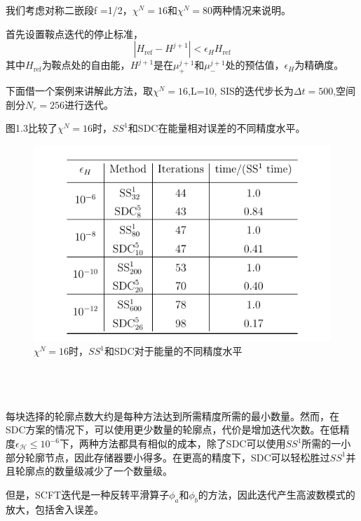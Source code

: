 我们考虑对称二嵌段f =1/2，$\chi^{N}=16$和$\chi^{N}=80$两种情况来说明。

首先设置鞍点迭代的停止标准，
\begin{equation}
\left|H_{\mathrm{ref}}-H^{j+1}\right|<\epsilon_{H} H_{\mathrm{ref}}
\end{equation}
其中$H_{\mathrm{ref}}$为鞍点处的自由能，$H^{j+1}$是在$\mu_{+}^{j+1}$和$\mu_{-}^{j+1}$处的预估值，$\epsilon_{H}$为精确度。

下面借一个案例来讲解此方法，取$\chi^N=16$,L=10,
SIS的迭代步长为$\Delta t=500$,空间剖分$N_r=256$进行迭代。

图1.3比较了$\chi^N=16$时，$SS^1$和SDC在能量相对误差的不同精度水平。
\begin{figure}[ht]
	\centering
	\includegraphics[scale=0.5]{7.png}
	\caption{$\chi^N=16$时，$SS^1$和SDC对于能量的不同精度水平}
	\label{fig:pathdemo}
\end{figure}
\\
\\
\\
每块选择的轮廓点数大约是每种方法达到所需精度所需的最小数量。然而，在SDC方案的情况下，可以使用更少数量的轮廓点，代价是增加迭代次数。在低精度$\epsilon_{\mathcal{H}} \leq 10^{-6}$下，两种方法都具有相似的成本，除了SDC可以使用$SS^1$所需的一小部分轮廓节点，因此存储器要小得多。在更高的精度下，SDC可以轻松胜过$SS^1$并且轮廓点的数量级减少了一个数量级。

但是，SCFT迭代是一种反转平滑算子$\phi_a$和$\phi_b$的方法，因此迭代产生高波数模式的放大，包括舍入误差。

